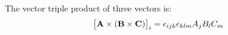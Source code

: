  The vector triple product of three vectors is:
\begin{equation}
\left[\mathbf{ A}\times\left(\mathbf{ B}\times\mathbf{ C}\right)\right]_{i}
=\epsilon_{ijk}\epsilon_{klm}A_{j}B_{l}C_{m}
\end{equation}
% 
% 
% 
% 
% 
% 
% 
% 
% 
% 
% 
